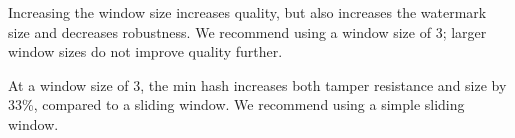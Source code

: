 

\smallskip{} 
Increasing the window size increases quality, but also increases the watermark size and decreases robustness.
We recommend using a window size of 3; larger window sizes do not improve quality further.


\smallskip{} 
At a window size of 3, the min hash increases both tamper resistance and size by 33\%, compared to a sliding window.
We recommend using a simple sliding window.





